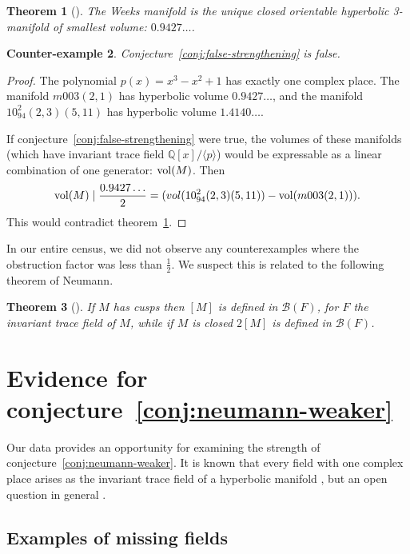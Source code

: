 \documentclass[10pt]{amsart}
\newtheorem{theorem}{Theorem}[section]
\newtheorem{counterexample}[theorem]{Counter-example}
\numberwithin{equation}{theorem}
\theoremstyle{definition}
\newcommand{\bloch}[1]{\mathcal{B}(#1)}
\begin{document}
\begin{theorem}[{\parencite[Corollary~1.3]{gmm-min-vol}}]
  \label{thm:weeks-is-min}
  The Weeks manifold is the unique closed orientable hyperbolic 3-manifold
  of smallest volume: $0.9427\dotsc$.
\end{theorem}

\begin{counterexample}
  Conjecture~\ref{conj:false-strengthening} is false.
\end{counterexample}
\begin{proof}
  The polynomial $p(x) = x^3 - x^2 + 1$ has exactly one complex
  place. The manifold $m003(2,1)$ has hyperbolic volume
  $0.9427\dotsc$, and the manifold $10^2_{94}(2,3)(5,11)$ has
  hyperbolic volume $1.4140\dotsc$.

  If conjecture~\ref{conj:false-strengthening} were true, the volumes of
  these manifolds (which have invariant trace field $\mathbb{Q}[x]/\langle
  p \rangle$) would be expressable as a linear combination of one
  generator: $\operatorname{vol}(M)$. Then \[ \operatorname{vol}(M) \mid \frac{0.9427\dotsc}{2} =
  (vol(10^2_{94}(2,3)(5,11)) - \operatorname{vol}(m003(2,1))). \] This would contradict
  theorem~\ref{thm:weeks-is-min}.
\end{proof}

In our entire census, we did not observe any counterexamples where the
obstruction factor was less than $\frac{1}{2}$.  We suspect this is
related to the following theorem of Neumann.

\begin{theorem}[{\parencite[Theorem~2.7]{neumann06}}]
  If $M$ has cusps then $[M]$ is defined in $\bloch{F}$, for $F$ the
  invariant trace field of $M$, while if $M$ is closed $2[M]$ is
  defined in $\bloch{F}$.
\end{theorem}

\section{Evidence for conjecture~\ref{conj:neumann-weaker}}
\label{sec:manifold-existence}

Our data provides an opportunity for examining the strength of
conjecture~\ref{conj:neumann-weaker}. It is known that every field with
one complex place arises as the invariant trace field of a hyperbolic
manifold \parencite{maclachlanreid}, but an open question in general
\parencite{neumann06}.

\subsection{Examples of missing fields}
\end{document}
